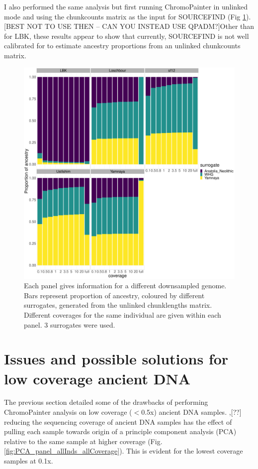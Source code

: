 I also performed the same analysis but first running ChromoPainter in unlinked mode and using the chunkcounts matrix as the input for SOURCEFIND (Fig \ref{fig:SOURCEFIND_3pop_unlinked_downsampled}). {\color{red}[BEST NOT TO USE THEN -- CAN YOU INSTEAD USE QPADM?]Other than for LBK, these results appear to show that currently, SOURCEFIND is not well calibrated for to estimate ancestry proportions from an unlinked chunkcounts matrix.}

\begin{figure}[htp]
    \centering
    \includegraphics[width=1.0\textwidth]{../images/chapter1/3pop_SF_downsampled_unlinked.pdf}
    \caption{Each panel gives information for a different downsampled genome. Bars represent proportion of ancestry, coloured by different surrogates, generated from the unlinked chunklengths matrix. Different coverages for the same individual are given within each panel. 3 surrogates were used.}
    \label{fig:SOURCEFIND_3pop_unlinked_downsampled}
\end{figure}

\section{Issues and possible solutions for low coverage ancient DNA}

The previous section detailed some of the drawbacks of performing ChromoPainter analysis on low coverage ($<$0.5x) ancient DNA samples{\color{red}. ,[??]} reducing the sequencing coverage of ancient DNA samples has the effect of pulling each sample towards origin of a principle component analysis (PCA) relative to the same sample at higher coverage (Fig. \ref{fig:PCA_panel_allInds_allCoverage}). This is evident for the lowest coverage samples at 0.1x. 

